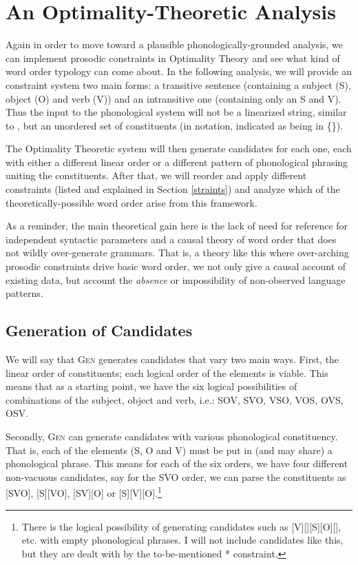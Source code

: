 \documentclass{article}
\newcommand{\nophi}{\textsc{*\textphi}}
\begin{document}
\section{An Optimality-Theoretic Analysis\label{otanal}}

Again in order to move toward a plausible phonologically-grounded analysis, we can implement prosodic constraints in Optimality Theory \parencite{prince93} and see what kind of word order typology can come about.
In the following analysis, we will provide an constraint system two main forms: a transitive sentence (containing a subject (S), object (O) and verb (V)) and an intransitive one (containing only an S and V).
Thus the input to the phonological system will not be a linearized string, similar to \textcite{halle87}, but an unordered set of constituents (in notation, indicated as being in \{\}).

The Optimality Theoretic system will then generate candidates for each one, each with either a different linear order or a different pattern of phonological phrasing uniting the constituents.
After that, we will reorder and apply different constraints (listed and explained in Section \ref{straints}) and analyze which of the theoretically-possible word order arise from this framework.

As a reminder, the main theoretical gain here is the lack of need for reference for independent syntactic parameters and a causal theory of word order that does not wildly over-generate grammars.
That is, a theory like this where over-arching prosodic constraints drive basic word order, we not only give a causal account of existing data, but account the \emph{absence} or impossibility of non-observed language patterns.

\subsection{Generation of Candidates\label{generation}}

We will say that \textsc{Gen} generates candidates that vary two main ways.
First, the linear order of constituents; each logical order of the elements is viable.
This means that as a starting point, we have the six logical possibilities of combinations of the subject, object and verb, i.e.: SOV, SVO, VSO, VOS, OVS, OSV.

Secondly, \textsc{Gen} can generate candidates with various phonological constituency.
That is, each of the elements (S, O and V) must be put in (and may share) a phonological phrase.
This means for each of the six orders, we have four different non-vacuous candidates, say for the SVO order, we can parse the constituents as [SVO], [S][VO], [SV][O] or [S][V][O].\footnote{There is the logical possibility of generating candidates such as [V][][S][O][], etc. with empty phonological phrases. I will not include candidates like this, but they are dealt with by the to-be-mentioned {\nophi} constraint.}
\end{document}
